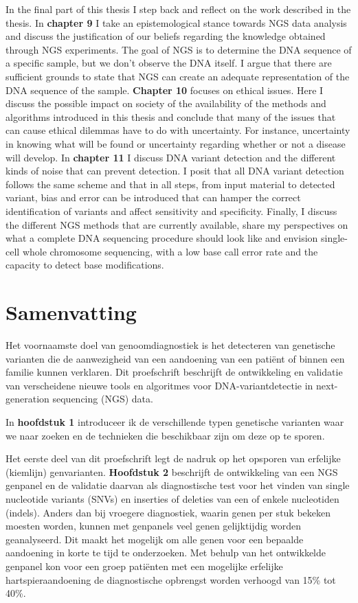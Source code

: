 \begin{appendices}
	In the final part of this thesis I step back and reflect on the work described in the thesis. In \textbf{chapter 9} I take an epistemological stance towards NGS data analysis and discuss the justification of our beliefs regarding the knowledge obtained through NGS experiments. The goal of NGS is to determine the DNA sequence of a specific sample, but we don’t observe the DNA itself. I argue that there are sufficient grounds to state that NGS can create an adequate representation of the DNA sequence of the sample. \textbf{Chapter 10} focuses on ethical issues. Here I discuss the possible impact on society of the availability of the methods and algorithms introduced in this thesis and conclude that many of the issues that can cause ethical dilemmas have to do with uncertainty. For instance, uncertainty in knowing what will be found or uncertainty regarding whether or not a disease will develop. In \textbf{chapter 11} I discuss DNA variant detection and the different kinds of noise that can prevent detection. I posit that all DNA variant detection follows the same scheme and that in all steps, from input material to detected variant, bias and error can be introduced that can hamper the correct identification of variants and affect sensitivity and specificity. Finally, I discuss the different NGS methods that are currently available, share my perspectives on what a complete DNA sequencing procedure should look like and envision single-cell whole chromosome sequencing, with a low base call error rate and the capacity to detect base modifications.
	

	
	\chapter{Samenvatting}
	Het voornaamste doel van genoomdiagnostiek is het detecteren van genetische varianten die de aanwezigheid van een aandoening van een patiënt of binnen een familie kunnen verklaren. Dit proefschrift beschrijft de ontwikkeling en validatie van verscheidene nieuwe tools en algoritmes voor DNA-variantdetectie in next-generation sequencing (NGS) data.
	
	In \textbf{hoofdstuk 1} introduceer ik de verschillende typen genetische varianten waar we naar zoeken en de technieken die beschikbaar zijn om deze op te sporen.
	
	Het eerste deel van dit proefschrift legt de nadruk op het opsporen van erfelijke (kiemlijn) genvarianten. \textbf{Hoofdstuk 2} beschrijft de ontwikkeling van een NGS genpanel en de validatie daarvan als diagnostische test voor het vinden van single nucleotide variants (SNVs) en inserties of deleties van een of enkele nucleotiden (indels). Anders dan bij vroegere diagnostiek, waarin genen per stuk bekeken moesten worden, kunnen met genpanels veel genen gelijktijdig worden geanalyseerd. Dit maakt het mogelijk om alle genen voor een bepaalde aandoening in korte te tijd te onderzoeken. Met behulp van het ontwikkelde genpanel kon voor een groep patiënten met een mogelijke erfelijke hartspieraandoening de diagnostische opbrengst worden verhoogd van 15\% tot 40\%. 
	

\end{appendices}
